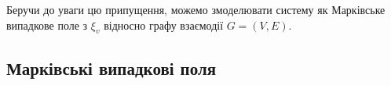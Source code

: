 \documentclass[oneside,draft,14pt]{extarticle}
\begin{document}
Беручи до уваги цю припущення, можемо змоделювати систему як Марківське випадкове поле з \(\xi_v\) відносно графу взаємодії \(G = (V, E)\).

\subsection{Марківські випадкові поля}

\clearpage

\nocite{David:1998}
\nocite{Knopov:2011}
\nocite{Knopov:1998}
\nocite{Chornei:2005}
\nocite{Koller:2009}



\end{document}
